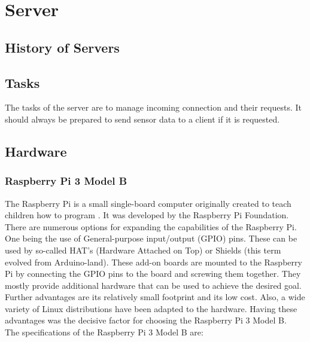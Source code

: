 \chapter{Server}
\label{ch:server}


\section{History of Servers}


\section{Tasks}
The tasks of the server are to manage incoming connection and their requests. It should always be prepared to send sensor data to a client if it is requested.

\section{Hardware}
\subsection{Raspberry Pi 3 Model B}
The Raspberry Pi is a small single-board computer originally created to teach children how to program \cite{RasPi}. It was developed by the Raspberry Pi Foundation. There are numerous options for expanding the capabilities of the Raspberry Pi. One being the use of General-purpose input/output (GPIO) pins. These can be used by so-called HAT's (Hardware Attached on Top) or Shields (this term evolved from Arduino-land). These add-on boards are mounted to the Raspberry Pi by connecting the GPIO pins to the board and screwing them together. They mostly provide additional hardware that can be used to achieve the desired goal. Further advantages are its relatively small footprint and its low cost. Also, a wide variety of Linux distributions have been adapted to the hardware. Having these advantages was the decisive factor for choosing the Raspberry Pi 3 Model B.\\
The specifications of the Raspberry Pi 3 Model B are:

